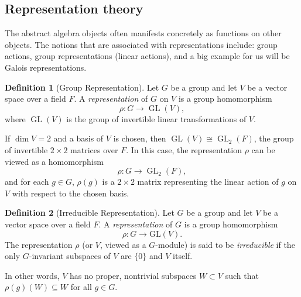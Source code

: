 \documentclass{article}
\theoremstyle{definition}
\newtheorem{definition}{Definition}[section]
\theoremstyle{definition}
\theoremstyle{definition}
\begin{document}
    


\subsection{Representation theory}

The abstract algebra objects often manifests concretely as functions on other objects. The notions that are associated with representations include: group actions, group representations (linear actions), and a big example for us will be Galois representations.





\begin{definition}[Group Representation]
Let \( G \) be a group and let \( V \) be a vector space over a field \( F \). A \emph{representation} of \( G \) on \( V \) is a group homomorphism
\[
\rho : G \to \operatorname{GL}(V),
\]
where \( \operatorname{GL}(V) \) is the group of invertible linear transformations of \( V \).



If \( \dim V = 2 \) and a basis of \( V \) is chosen, then \( \operatorname{GL}(V) \cong \operatorname{GL}_2(F) \), the group of invertible \( 2 \times 2 \) matrices over \( F \). In this case, the representation \( \rho \) can be viewed as a homomorphism
\[
\rho : G \to \operatorname{GL}_2(F),
\]
and for each \( g \in G \), \( \rho(g) \) is a \( 2 \times 2 \) matrix representing the linear action of \( g \) on \( V \) with respect to the chosen basis.
\end{definition}

\begin{definition}[Irreducible Representation]
Let \( G \) be a group and let \( V \) be a vector space over a field \( F \). A \emph{representation} of \( G \) is a group homomorphism
\[
\rho : G \longrightarrow \mathrm{GL}(V).
\]
The representation \( \rho \) (or \( V \), viewed as a \( G \)-module) is said to be \emph{irreducible} if the only \( G \)-invariant subspaces of \( V \) are \( \{0\} \) and \( V \) itself.

In other words, \( V \) has no proper, nontrivial subspaces \( W \subset V \) such that \( \rho(g)(W) \subseteq W \) for all \( g \in G \).
\end{definition}
\end{document}
